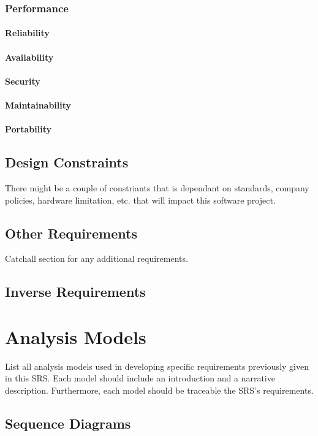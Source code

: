\documentclass[a4paper]{article}
\begin{document}
\subsubsection{Performance}
\paragraph{Reliability}
\paragraph{Availability}
\paragraph{Security}
\paragraph{Maintainability}
\paragraph{Portability}

\subsection{Design Constraints}
There might be a couple of constriants that is dependant on standards, company policies, hardware limitation, etc. that will impact this software project.

\subsection{Other Requirements}
Catchall section for any additional requirements.

\subsection{Inverse Requirements}

\section{Analysis Models}
List all analysis models used in developing specific requirements previously given in this SRS.  Each model should include an introduction and a narrative description.  Furthermore, each model should be traceable the SRS’s requirements.

\subsection{Sequence Diagrams}
\end{document}
